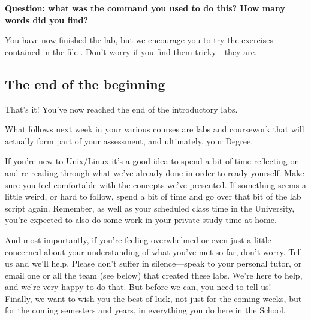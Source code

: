 \begin{enumerate}
  \textbf{Question: what was the command you used to do this? How many words did you find?}

\end{enumerate}

You have now finished the lab, but we encourage you to try the exercises
contained in the file . Don't worry if you find them
tricky---they are.

\subsection{The end of the beginning}

That's it! You've now reached the end of the introductory labs.  

What follows next week in your various courses are labs and coursework
that will actually form part of your assessment, and ultimately, your
Degree.

If you're new to Unix/Linux it's a good idea to spend a bit of time
reflecting on and re-reading through what we've already done in order
to ready yourself. Make sure you feel comfortable with the concepts
we've presented. If something seems a little weird, or hard to follow,
spend a bit of time and go over that bit of the lab script
again. Remember, as well as your scheduled class time in the
University, you're expected to also do some work in your private study
time at home.

And most importantly, if you're feeling overwhelmed or even just a
little concerned about your understanding of what you've met so far,
don't worry. Tell us and we'll help.  Please don't suffer in
silence---speak to your personal tutor, or email one or all the team
(see below) that created these labs. We're here to help, and we're
very happy to do that. But before we can, you need to tell us!  \\

Finally, we want to wish you the best of luck, not just for the coming
weeks, but for the coming semesters and years, in everything you do
here in the School.\\
\\

